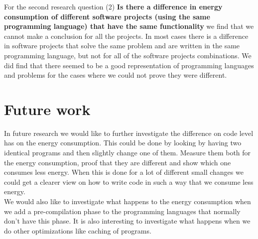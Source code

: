 For the second research question (2) \textbf{Is there a difference in energy consumption of different software projects (using the same programming language) that have the same functionality} we find that we cannot make a conclusion for all the projects. In most cases there is a difference in software projects that solve the same problem and are written in the same programming language, but not for all of the software projects combinations. We did find that there seemed to be a good representation of programming languages and problems for the cases where we could not prove they were different.

\section{Future work}
\label{sec:future_work}
In future research we would like to further investigate the difference on code level has on the energy consumption. This could be done by looking by having two identical programs and then slightly change one of them. Measure them both for the energy consumption, proof that they are different and show which one consumes less energy. When this is done for a lot of different small changes we could get a clearer view on how to write code in such a way that we consume less energy.\\

We would also like to investigate what happens to the energy consumption when we add a pre-compilation phase to the programming languages that normally don't have this phase. It is also interesting to investigate what happens when we do other optimizations like caching of programs.

